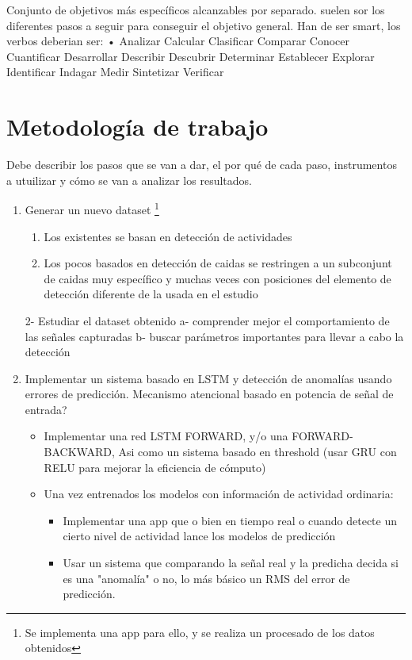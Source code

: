 \documentclass[../tfm.tex]{subfiles}
\begin{document}
Conjunto de objetivos más específicos alcanzables por separado. suelen sor los diferentes pasos a seguir para conseguir el objetivo general. Han de ser smart, los verbos deberian ser:     • Analizar
Calcular
Clasificar
Comparar
Conocer
Cuantificar
Desarrollar
Describir
Descubrir
Determinar
Establecer
Explorar
Identificar
Indagar
Medir
Sintetizar
Verificar

\section{Metodología de trabajo}

Debe describir los pasos que se van a dar, el por qué de cada paso, instrumentos a utuilizar y cómo se van a analizar los resultados.

\begin{enumerate}
  \item Generar un nuevo dataset \footnote{Se implementa una app para ello, y se realiza un procesado de los datos obtenidos}
  \begin{enumerate}
    \item Los existentes se basan en detección de actividades
    \item Los pocos basados en detección de caidas se restringen a un subconjunt de caidas muy específico y muchas veces con posiciones del elemento de detección diferente de la usada en el estudio
  \end{enumerate}

  2- Estudiar el dataset obtenido
  a- comprender mejor el comportamiento de las señales capturadas
  b- buscar parámetros importantes para llevar a cabo la detección

  \item Implementar un sistema basado en LSTM y detección de anomalías usando errores de predicción. Mecanismo atencional basado en potencia de señal de entrada?
  \begin{itemize}
    \item Implementar una red LSTM FORWARD, y/o una FORWARD-BACKWARD, Asi como un sistema basado en threshold (usar GRU con RELU para mejorar la eficiencia de cómputo)
    \item Una vez entrenados los modelos con información de actividad ordinaria:
    \begin{itemize}
      \item Implementar una app que o bien en tiempo real o cuando detecte un cierto nivel de actividad lance los modelos de predicción
      \item Usar un sistema que comparando la señal real y la predicha decida si es una "anomalía" o no, lo más básico un RMS del error de predicción.
    \end{itemize}
  \end{itemize}


\end{enumerate}
\end{document}
